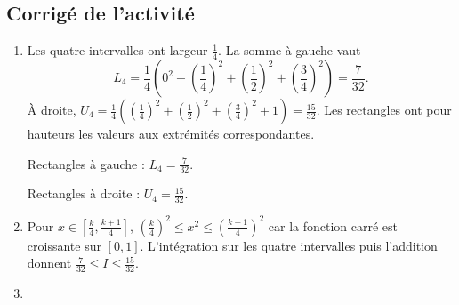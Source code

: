 \subsection{Corrigé de l'activité}\begin{enumerate}
\item Les quatre intervalles ont largeur $\frac{1}{4}$. La somme à gauche vaut
\[L_4=\frac{1}{4}(0^2+(\frac{1}{4})^2+(\frac{1}{2})^2+(\frac{3}{4})^2)=\frac{7}{32}.\]
À droite, $U_4=\frac{1}{4}((\frac{1}{4})^2+(\frac{1}{2})^2+(\frac{3}{4})^2+1)=\frac{15}{32}$. Les rectangles ont pour hauteurs les valeurs aux extrémités correspondantes.
\begin{center}\begin{minipage}{.47\linewidth}\centering
{}\par\small Rectangles à gauche : $L_4=\frac{7}{32}$.\end{minipage}\hfill\begin{minipage}{.47\linewidth}\centering
{}\par\small Rectangles à droite : $U_4=\frac{15}{32}$.\end{minipage}\end{center}
\item Pour $x\in[\frac{k}{4},\frac{k+1}{4}]$, $(\frac{k}{4})^2\le x^2\le(\frac{k+1}{4})^2$ car la fonction carré est croissante sur $[0,1]$. L'intégration sur les quatre intervalles puis l'addition donnent $\frac{7}{32}\le I\le\frac{15}{32}$.
\item 
\begin{lstlisting}

\end{lstlisting}
\end{enumerate}
